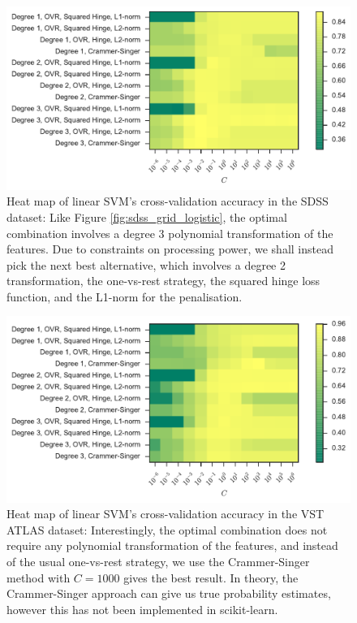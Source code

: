 \begin{figure}[p]
	\centering
	\includegraphics[width=\textwidth]{figures/4_expt1/sdss_grid_poly}
	\caption[Heat map of linear SVM's CV accuracy in SDSS]{
		Heat map of linear SVM's cross-validation accuracy in the SDSS dataset:
		Like Figure \ref{fig:sdss_grid_logistic}, the optimal
		combination involves a degree 3 polynomial transformation of the features.
		Due to constraints on
		processing power, we shall instead pick the next best alternative, which involves
		a degree 2 transformation, the one-vs-rest strategy, the squared hinge loss function,
		and the L1-norm for the penalisation.}
	\label{fig:sdss_grid_poly}
\end{figure}

\begin{figure}[p]
	\centering
	\includegraphics[width=\textwidth]{figures/4_expt1/vstatlas_grid_poly}
	\caption[Heat map of linear SVM's CV accuracy in VST ATLAS]{
		Heat map of linear SVM's cross-validation accuracy in the VST ATLAS dataset:
		Interestingly, the optimal combination does not require any polynomial
		transformation of the features, and instead of the usual one-vs-rest strategy,
		we use the Crammer-Singer method
		with $C = 1000$ gives the best result. In theory, the Crammer-Singer approach
		can give us true probability estimates, however this has not been implemented
		in scikit-learn.}
	\label{fig:vstatlas_grid_poly}
\end{figure}

